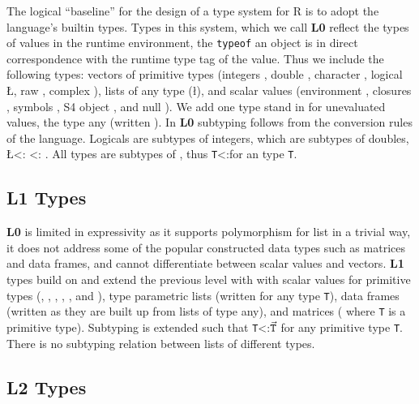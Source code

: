 \documentclass[acmsmall,10pt,review,anonymous]{acmart}\settopmatter{printfolios=true,printccs=false,printacmref=false}
\newcommand{\code}[1]{\lstinline|#1|\xspace}
\begin{document}
The logical ``baseline'' for the design of a type system for R is to adopt
the language's builtin types.  Types in this system, which we call {\bf L0}
reflect the types of values in the runtime environment, the \code{typeof} an
object is in direct correspondence with the runtime type tag of the value.
Thus we include the following types: vectors of primitive types (integers
\I, double \D, character \C, logical \L, raw \R, complex \X), lists of any
type (\l), and scalar values (environment \sE, closures \sF, symbols \sY, S4
object \sS, and null \sN). We add one type stand in for unevaluated values,
the type any (written \ANY). In {\bf L0} subtyping follows from the
conversion rules of the language.  Logicals are subtypes of integers, which
are subtypes of doubles, \L <: \I <: \D.  All types are subtypes of \ANY,
thus {\tt T}<:\ANY for an type {\tt T}.

%
%
\subsection{L1 Types}
\label{sec:L1def}

{\bf L0} is limited in expressivity as it supports polymorphism for list in
a trivial way, it does not address some of the popular constructed data
types such as matrices and data frames, and cannot differentiate between
scalar values and vectors.  {\bf L1} types build on and extend the previous
level with with scalar values for primitive types (\sI, \sD, \sC, \sL, \sR,
and \sX), type parametric lists (written  for any type {\tt T}), data
frames (written  as they are built up from lists of type any),
and matrices ( where {\tt T} is a primitive type).
Subtyping is extended such that {\tt T}<:{$\vec{\tt T}$} for any primitive
type {\tt T}. There is no subtyping relation between lists of different
types.

\subsection{L2 Types}
\label{sec:L2def}
\end{document}
